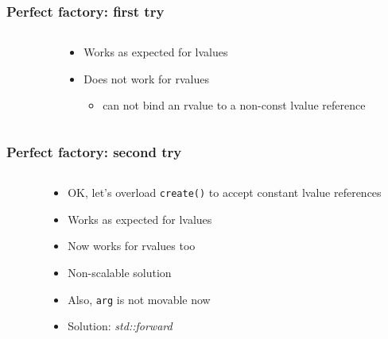 \documentclass[aspectratio=169]{beamer}
\newcommand{\greenemph}[1]{\textit{\textcolor{clGreen}{#1}}}
\begin{document}
\begin{frame}[fragile]
\frametitle{Perfect factory: first try}
\begin{columns}
  \begin{column}{0.6\textwidth}
    {\tiny }
  \end{column}
  \begin{column}{0.4\textwidth}
    \begin{itemize}
      \item{Works as expected for lvalues}
      \item{Does not work for rvalues}
      \begin{itemize}
        \item{can not bind an rvalue to a non-const lvalue reference}
      \end{itemize}
    \end{itemize}
  \end{column}
\end{columns}
\end{frame}

\begin{frame}[fragile]
\frametitle{Perfect factory: second try}
\begin{columns}
  \begin{column}{0.6\textwidth}
    {\tiny }
  \end{column}
  \begin{column}{0.4\textwidth}
    \begin{itemize}
      \item{OK, let's overload \texttt{create()} to accept constant lvalue references}
      \item{Works as expected for lvalues}
      \item{Now works for rvalues too}
      \item{\textcolor{clRedFlag}{Non-scalable solution}}
      \item{\textcolor{clRedFlag}{Also, \texttt{arg} is not movable now}}
      \item{Solution: \greenemph{std::forward}}
    \end{itemize}
  \end{column}
\end{columns}
\end{frame}
\end{document}
